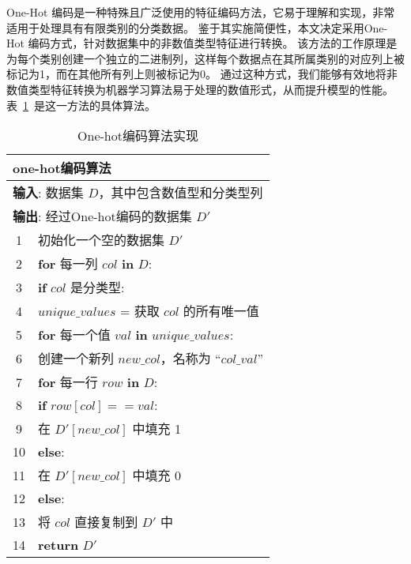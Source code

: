 One-Hot 编码是一种特殊且广泛使用的特征编码方法，它易于理解和实现，非常适用于处理具有有限类别的分类数据。
鉴于其实施简便性，本文决定采用One-Hot 编码方式，针对数据集中的非数值类型特征进行转换。
该方法的工作原理是为每个类别创建一个独立的二进制列，这样每个数据点在其所属类别的对应列上被标记为1，而在其他所有列上则被标记为0。
通过这种方式，我们能够有效地将非数值类型特征转换为机器学习算法易于处理的数值形式，从而提升模型的性能。
表~\ref{tab:onehot}~是这一方法的具体算法。\par
\begin{table}[htbp]
	\caption{One-hot编码算法实现}
	\label{tab:onehot}
	\centering
	\begin{tabularx}{1.0\textwidth}{cl}
		\toprule
		\multicolumn{2}{l}{\textbf{one-hot编码算法}}                              \\
		\midrule
		\multicolumn{2}{l}{\textbf{输入}: 数据集 $D$，其中包含数值型和分类型列}                 \\
		\multicolumn{2}{l}{\textbf{输出}: 经过One-hot编码的数据集 $D'$}                 \\
		1  & 初始化一个空的数据集 $D'$                                                  \\
		2  & \textbf{for} 每一列 $col$ \textbf{in} $D$:                          \\
		3  & \quad \textbf{if} $col$ 是分类型:                                    \\
		4  & \quad\quad $unique\_values$ = 获取 $col$ 的所有唯一值                    \\
		5  & \quad\quad \textbf{for} 每一个值 $val$ \textbf{in} $unique\_values$: \\
		6  & \quad\quad\quad 创建一个新列 $new\_col$，名称为 ``$col\_val$''             \\
		7  & \quad\quad\quad \textbf{for} 每一行 $row$ \textbf{in} $D$:          \\
		8  & \quad\quad\quad\quad \textbf{if} $row[col] == val$:              \\
		9  & \quad\quad\quad\quad\quad 在 $D'[new\_col]$ 中填充 1                 \\
		10 & \quad\quad\quad\quad \textbf{else}:                              \\
		11 & \quad\quad\quad\quad\quad 在 $D'[new\_col]$ 中填充 0                 \\
		12 & \quad \textbf{else}:                                             \\
		13 & \quad\quad 将 $col$ 直接复制到 $D'$ 中                                  \\
		14 & \textbf{return} $D'$                                             \\
		\bottomrule
	\end{tabularx}
\end{table}

